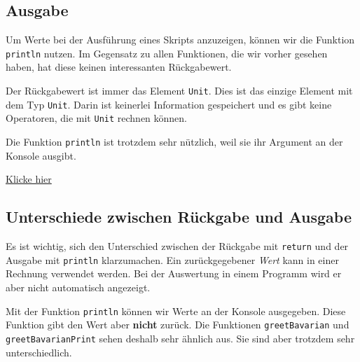 \subsection{Ausgabe}\label{ausgabe}

Um Werte bei der Ausführung eines Skripts anzuzeigen, können wir die
Funktion \texttt{println} nutzen. Im Gegensatz zu allen Funktionen, die
wir vorher gesehen haben, hat diese keinen interessanten Rückgabewert.

Der Rückgabewert ist immer das Element \texttt{Unit}. Dies ist das
einzige Element mit dem Typ \texttt{Unit}. Darin ist keinerlei
Information gespeichert und es gibt keine Operatoren, die mit
\texttt{Unit} rechnen können.

Die Funktion \texttt{println} ist trotzdem sehr nützlich, weil sie ihr
Argument an der Konsole ausgibt.

\label{e4e5a9d78dbabc2d}
\href{https://pl.kotl.in/vVkXn2j-h}{Klicke hier}

\label{188334ff-3fac-4f2e-affb-ae304b150eb0}

\label{6c2bdf42}
\subsection{Unterschiede zwischen Rückgabe und
Ausgabe}\label{unterschiede-zwischen-ruxfcckgabe-und-ausgabe}

Es ist wichtig, sich den Unterschied zwischen der Rückgabe mit
\texttt{return} und der Ausgabe mit \texttt{println} klarzumachen. Ein
zurückgegebener \emph{Wert} kann in einer Rechnung verwendet werden. Bei
der Auswertung in einem Programm wird er aber nicht automatisch
angezeigt.

Mit der Funktion \texttt{println} können wir Werte an der Konsole
ausgegeben. Diese Funktion gibt den Wert aber \textbf{nicht} zurück. Die
Funktionen \texttt{greetBavarian} und \texttt{greetBavarianPrint} sehen
deshalb sehr ähnlich aus. Sie sind aber trotzdem sehr unterschiedlich.

\label{1a5a83bb264ebe17}
\begin{Shaded}
\begin{Highlighting}[]
 \OperatorTok{(}\OperatorTok{:} \OperatorTok{):}  \OperatorTok{\{}
      \OperatorTok{+}
\OperatorTok{\}}

 \OperatorTok{(}\OperatorTok{:} \OperatorTok{):}  \OperatorTok{\{}
\OperatorTok{(}  \OperatorTok{+}\OperatorTok{)}
\OperatorTok{\}} 
\end{Highlighting}
\end{Shaded}

